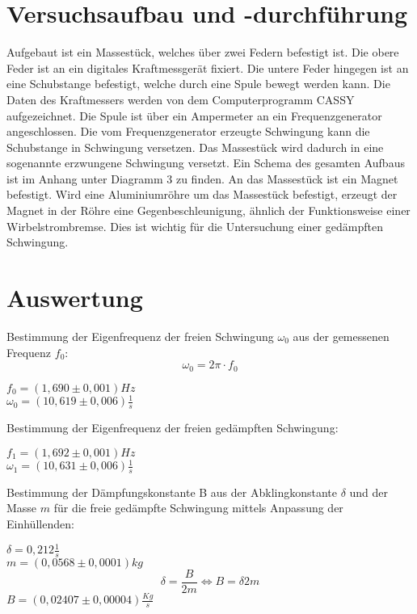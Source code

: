 \documentclass[11pt]{article}
\begin{document}
\section{Versuchsaufbau und -durchführung}
Aufgebaut ist ein Massestück, welches über zwei Federn befestigt ist. Die obere Feder ist an ein digitales Kraftmessgerät fixiert. Die untere Feder hingegen ist an eine Schubstange befestigt, welche durch eine Spule bewegt werden kann. Die Daten des Kraftmessers werden von dem Computerprogramm CASSY aufgezeichnet. Die Spule ist über ein Ampermeter an ein Frequenzgenerator angeschlossen. Die vom Frequenzgenerator erzeugte Schwingung kann die Schubstange in Schwingung versetzen. Das Massestück wird dadurch in eine sogenannte erzwungene Schwingung versetzt. Ein Schema des gesamten Aufbaus ist im Anhang unter Diagramm 3 zu finden. An das Massestück ist ein Magnet befestigt. Wird eine Aluminiumröhre um das Massestück befestigt, erzeugt der Magnet in der Röhre eine Gegenbeschleunigung, ähnlich der Funktionsweise einer Wirbelstrombremse. Dies ist wichtig für die Untersuchung einer gedämpften Schwingung.

\section{Auswertung}
 
Bestimmung der Eigenfrequenz der freien Schwingung $\omega_0$ aus der gemessenen Frequenz $f_0$:\\
$$\omega_0= 2\pi\cdot f_0$$ 
\begin{center}
$f_0=(1,690\pm 0,001)Hz$\\
$\omega_0=(10,619\pm 0,006)\frac{1}{s}$\\
\end{center}

Bestimmung der Eigenfrequenz der freien gedämpften Schwingung:\\
\begin{center}
$f_1 =(1,692\pm 0,001)Hz$\\
$\omega_1=(10,631\pm 0,006)\frac{1}{s}$\\
\end{center}

Bestimmung der Dämpfungskonstante B aus der Abklingkonstante $\delta$ und der Masse $m$ für die freie gedämpfte Schwingung mittels Anpassung der Einhüllenden:\\
\begin{center}
$\delta=0,212 \frac{1}{s}$\\
$m=(0,0568\pm 0,0001)kg$
$$\delta=\frac{B}{2m} \Leftrightarrow B = \delta 2m$$
$B=(0,02407\pm 0,00004) \frac{Kg}{s}$\\
\end{center}
\end{document}
